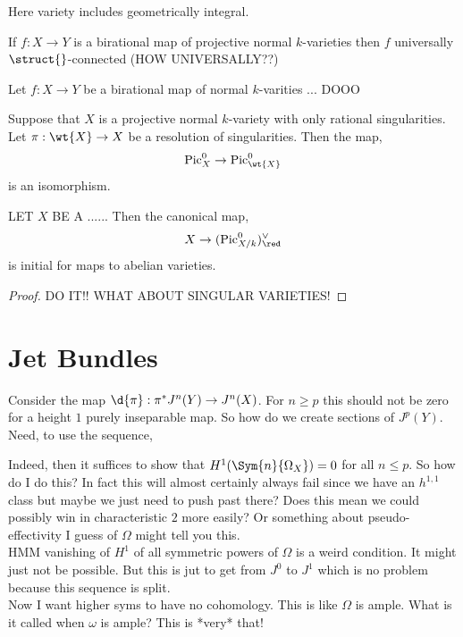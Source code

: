 \documentclass[12pt]{article}
\begin{document}
\begin{rmk}
Here variety includes geometrically integral.
\end{rmk}

\begin{lemma}
If $f : X \to Y$ is a birational map of projective normal $k$-varieties then $f$ universally $\struct{}$-connected (HOW UNIVERSALLY??)
\end{lemma}

\begin{cor}
Let $f : X \to Y$ be a birational map of normal $k$-varities ... DOOO
\end{cor}

\begin{prop}
Suppose that $X$ is a projective normal $k$-variety with only rational singularities. Let $\pi : \wt{X} \to X$ be a resolution of singularities. Then the map,
\[ \fPic_{X}^0 \to \fPic_{\wt{X}}^0 \]
is an isomorphism.
\end{prop}

\begin{prop}
LET $X$ BE A ...... Then the canonical map,
\[ X \to (\fPic_{X/k}^0)_{\red}^\vee \]
is initial for maps to abelian varieties. 
\end{prop}

\begin{proof}
DO IT!! WHAT ABOUT SINGULAR VARIETIES!
\end{proof}

\section{Jet Bundles}


Consider the map $\d{\pi} : \pi^* J^n(Y) \to J^n(X)$. For $n \ge p$ this should not be zero for a height $1$ purely inseparable map. So how do we create sections of $J^p(Y)$. Need, to use the sequence,
\begin{center}
\end{center}
Indeed, then it suffices to show that $H^1(\Sym{n}{\Omega_X}) = 0$ for all $n \le p$. So how do I do this? In fact this will almost certainly always fail since we have an $h^{1,1}$ class but maybe we just need to push past there? Does this mean we could possibly win in characteristic $2$ more easily? Or something about pseudo-effectivity I guess of $\Omega$ might tell you this.
\bigskip\\
HMM vanishing of $H^1$ of all symmetric powers of $\Omega$ is a weird condition. It might just not be possible. But this is jut to get from $J^0$ to $J^1$ which is no problem because this sequence is split.
\bigskip\\
Now I want higher syms to have no cohomology. This is like $\Omega$ is ample. What is it called when $\omega$ is ample? This is *very* that!
\end{document}

